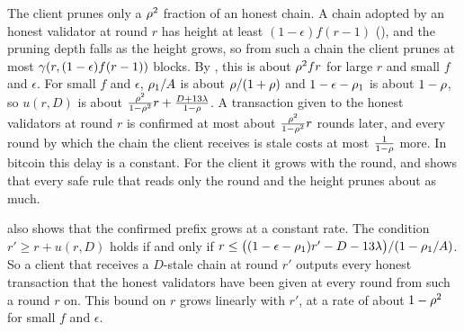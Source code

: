 The client prunes only a $\rho^2$ fraction of an honest chain. A chain adopted
by an honest validator at round $r$ has height at least $(1-\epsilon)f(r-1)$
(), and the pruning depth falls as the height grows, so from
such a chain the client prunes at most $\gamma(r,(1-\epsilon)f(r-1))$ blocks. By
, this is about $\rho^2fr$ for large $r$ and small $f$ and
$\epsilon$. For small $f$ and $\epsilon$, $\rho_1/A$ is about
$\rho/(1+\rho)$ and $1-\epsilon-\rho_1$ is about $1-\rho$, so $u(r,D)$ is
about $\frac{\rho^2}{1-\rho^2}r+\frac{D+13\lambda}{1-\rho}$. A transaction
given to the honest validators at round $r$ is confirmed at most about
$\frac{\rho^2}{1-\rho^2}r$ rounds later, and every round by which the chain
the client receives is stale costs at most $\frac{1}{1-\rho}$ more. In bitcoin
this delay is a constant. For the client it grows with the round, and
 shows that every safe rule that reads only the round and
the height prunes about as much.

 also shows that the confirmed prefix grows at a constant
rate. The condition $r'\ge r+u(r,D)$ holds if and only if
$r\le\big((1-\epsilon-\rho_1)r'-D-13\lambda\big)/(1-\rho_1/A)$. So a
client that receives a $D$-stale chain at round $r'$ outputs every honest
transaction that the honest validators have been given at every round from such
a round $r$ on. This bound on $r$ grows linearly with $r'$, at a rate of about
$1-\rho^2$ for small $f$ and $\epsilon$.
